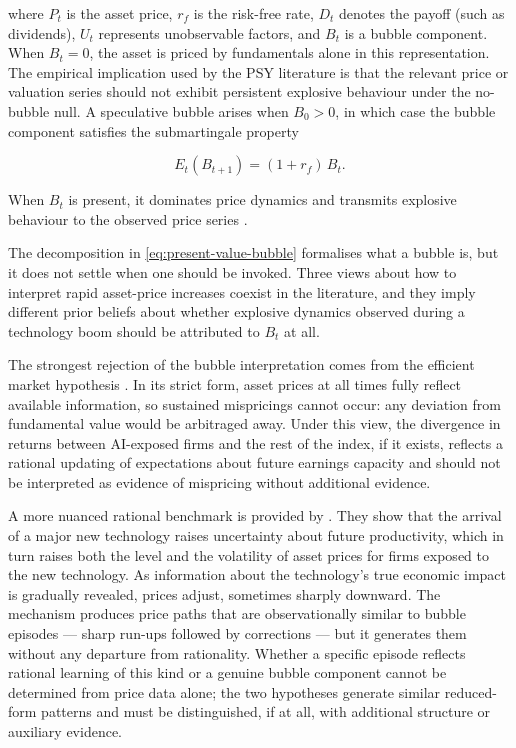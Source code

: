\noindent where $P_t$ is the asset price, $r_f$ is the risk-free rate, $D_t$ denotes the payoff (such as dividends), $U_t$ represents unobservable factors, and $B_t$ is a bubble component. When $B_t = 0$, the asset is priced by fundamentals alone in this representation. The empirical implication used by the PSY literature is that the relevant price or valuation series should not exhibit persistent explosive behaviour under the no-bubble null. A speculative bubble arises when $B_0 > 0$, in which case the bubble component satisfies the submartingale property

\begin{equation}
E_t(B_{t+1}) = (1+r_f)\, B_t.
\label{eq:bubble-submartingale}
\end{equation}

\noindent When $B_t$ is present, it dominates price dynamics and transmits explosive behaviour to the observed price series \citep{phillipsShiYu2015a}.

The decomposition in \cref{eq:present-value-bubble} formalises what a bubble is, but it does not settle when one should be invoked. Three views about how to interpret rapid asset-price increases coexist in the literature, and they imply different prior beliefs about whether explosive dynamics observed during a technology boom should be attributed to $B_t$ at all.

The strongest rejection of the bubble interpretation comes from the efficient market hypothesis \citep{fama1970}. In its strict form, asset prices at all times fully reflect available information, so sustained mispricings cannot occur: any deviation from fundamental value would be arbitraged away. Under this view, the divergence in returns between AI-exposed firms and the rest of the index, if it exists, reflects a rational updating of expectations about future earnings capacity and should not be interpreted as evidence of mispricing without additional evidence.

A more nuanced rational benchmark is provided by \citet{pastorVeronesi2009}. They show that the arrival of a major new technology raises uncertainty about future productivity, which in turn raises both the level and the volatility of asset prices for firms exposed to the new technology. As information about the technology's true economic impact is gradually revealed, prices adjust, sometimes sharply downward. The mechanism produces price paths that are observationally similar to bubble episodes --- sharp run-ups followed by corrections --- but it generates them without any departure from rationality. Whether a specific episode reflects rational learning of this kind or a genuine bubble component cannot be determined from price data alone; the two hypotheses generate similar reduced-form patterns and must be distinguished, if at all, with additional structure or auxiliary evidence.

